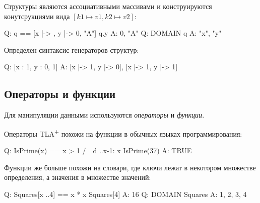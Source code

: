 \documentclass[14pt, openany]{book}
\newcommand{\tlapl}{TLA\textsuperscript{+} }
\begin{document}
Структуры являются ассоциативными массивами и конструируются конутсрукциями вида \([k1 \mapsto v1, k2 \mapsto v2]\):
\begin{tla}
  Q: q == [x |-> {}, y |-> {0, "A"}]
     q.y
  A: {0, "A"}
  Q: DOMAIN q
  A: {"x", "y"}
\end{tla}
\begin{tlatex}
%
%
%
%
\end{tlatex}

Определен синтаксис генераторов структур:

\begin{tla}
  Q: [x : {1}, y : {0, 1}]
  A: {[x |-> 1, y |-> 0], [x |-> 1, y |-> 1]}
\end{tla}
\begin{tlatex}
%
\end{tlatex}


\subsection{Операторы и функции}
Для манипуляции данными используются \emph{операторы} и \emph{функции}.

Операторы \tlapl похожи на функции в обычных языках программирования:

\begin{tla}
  Q: IsPrime(x) == x > 1 /\ ~\E d ..x-1: x %
     IsPrime(37)
  A: TRUE
\end{tla}
\begin{tlatex}
%
%
\end{tlatex}

Функции же больше похожи на словари, где ключи лежат в некотором множестве определения, а значения в множестве значений:

\begin{tla}
  Q: Squares[x ..4] == x * x
     Squares[4]
  A: 16
  Q: DOMAIN Squares
  A: {1, 2, 3, 4}
\end{tla}
\begin{tlatex}
%
%
%
%
\end{tlatex}
\end{document}
